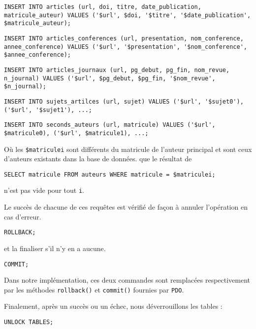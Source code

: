 \documentclass[a4paper, 12pt]{article}
\begin{document}
    \begin{description}[leftmargin=*]
        \item[articles]\mbox{}
        \begin{lstlisting}[style=sql, gobble=12]
            INSERT INTO articles (url, doi, titre, date_publication, matricule_auteur) VALUES ('$url', $doi, '$titre', '$date_publication', $matricule_auteur);
        \end{lstlisting}
        \item[articles\_conferences]\mbox{}
        \begin{lstlisting}[style=sql, gobble=12]
            INSERT INTO articles_conferences (url, presentation, nom_conference, annee_conference) VALUES ('$url', '$presentation', '$nom_conference', $annee_conference);
        \end{lstlisting}
        \item[articles\_journaux]\mbox{}
        \begin{lstlisting}[style=sql, gobble=12]
            INSERT INTO articles_journaux (url, pg_debut, pg_fin, nom_revue, n_journal) VALUES ('$url', $pg_debut, $pg_fin, '$nom_revue', $n_journal);
        \end{lstlisting}
        \item[sujets\_articles]\mbox{}
        \begin{lstlisting}[style=sql, gobble=12]
            INSERT INTO sujets_artilces (url, sujet) VALUES ('$url', '$sujet0'), ('$url', '$sujet1'), ...;
        \end{lstlisting}
        \item[seconds\_auteurs]\mbox{}
        \begin{lstlisting}[style=sql, gobble=12]
            INSERT INTO seconds_auteurs (url, matricule) VALUES ('$url', $matricule0), ('$url', $matricule1), ...;
        \end{lstlisting}
        Où les \texttt{\$matriculei} sont différents du matricule de l'auteur principal et sont ceux d'auteurs existants dans la base de données. \Cad{} que le résultat de
        \begin{lstlisting}[style=sql, gobble=12]
            SELECT matricule FROM auteurs WHERE matricule = $matriculei;
        \end{lstlisting}
        n'est pas vide pour tout \texttt{i}.
    \end{description}
    Le succès de chacune de ces requêtes est vérifié de façon à annuler l'opération en cas d'erreur.
    \begin{lstlisting}[style=php, gobble=8]
        ROLLBACK;
    \end{lstlisting}
    et la finaliser s'il n'y en a aucune.
    \begin{lstlisting}[style=sql, gobble=8]
        COMMIT;
    \end{lstlisting}
    Dans notre implémentation, ces deux commandes sont remplacées respectivement par les méthodes \texttt{rollback()} et \texttt{commit()} fournies par \texttt{PDO}. \par
    Finalement, après un succès ou un échec, nous déverrouillons les tables :
    \begin{lstlisting}[style=sql, gobble=8]
        UNLOCK TABLES;
    \end{lstlisting}
    \newpage
\end{document}
